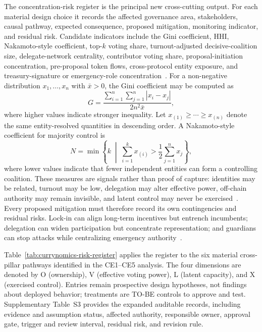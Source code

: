 \documentclass[referee,sn-basic]{sn-jnl}
\begin{document}
The concentration-risk register is the principal new cross-cutting output. For
each material design choice it records the affected governance area,
stakeholders, causal pathway, expected consequence, proposed mitigation,
monitoring indicator, and residual risk. Candidate indicators include the Gini
coefficient, HHI, Nakamoto-style coefficient, top-$k$ voting share,
turnout-adjusted decisive-coalition size, delegate-network centrality,
contributor voting share, proposal-initiation concentration, pre-proposal token
flows, cross-protocol entity exposure, and treasury-signature or emergency-role
concentration~\cite{Kitzler2025Governance,Eisermann2025Concentration}.
For a non-negative distribution $x_1,\ldots,x_n$ with $\bar{x}>0$, the Gini
coefficient may be computed as
\begin{equation}
G=\frac{\sum_{i=1}^{n}\sum_{j=1}^{n}|x_i-x_j|}{2n^2\bar{x}},
\end{equation}
where higher values indicate stronger inequality. Let
$x_{(1)}\geq\cdots\geq x_{(n)}$ denote the same entity-resolved quantities in
descending order. A Nakamoto-style coefficient for majority control is
\begin{equation}
N=\min\left\{k\;\middle|\;\sum_{i=1}^{k}x_{(i)}>
\frac{1}{2}\sum_{j=1}^{n}x_j\right\},
\end{equation}
where lower values indicate that fewer independent entities can form a
controlling coalition. These measures are signals rather than proof of capture:
identities may be related, turnout may be low, delegation may alter effective
power, off-chain authority may remain invisible, and latent control may never
be exercised~\cite{Fritsch2024VotingPower}. Every proposed mitigation must
therefore record its own contingencies and residual risks. Lock-in can align
long-term incentives but entrench incumbents; delegation can widen
participation but concentrate representation; and guardians can stop attacks
while centralizing emergency authority~\cite{Han2025Review,
Han2026DAOGovernance}.

Table~\ref{tab:currynomics-risk-register} applies the register to the six
material cross-pillar pathways identified in the CE1--CE5 analysis. The four dimensions are denoted
by O (ownership), V (effective voting power), L (latent capacity), and X
(exercised control). Entries remain prospective design hypotheses, not findings
about deployed behavior; treatments are TO-BE controls to approve and test.
Supplementary Table~S3 provides the expanded auditable records, including evidence
and assumption status, affected authority, responsible owner, approval gate,
trigger and review interval, residual risk, and revision rule.
\end{document}
